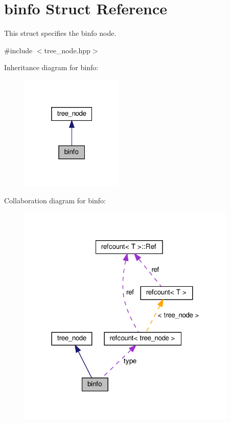 \hypertarget{structbinfo}{}\section{binfo Struct Reference}
\label{structbinfo}


This struct specifies the binfo node.  




{\ttfamily \#include $<$tree\+\_\+node.\+hpp$>$}



Inheritance diagram for binfo\+:
\nopagebreak
\begin{figure}[H]
\begin{center}
\leavevmode
\includegraphics[width=139pt]{da/d4d/structbinfo__inherit__graph}
\end{center}
\end{figure}


Collaboration diagram for binfo\+:
\nopagebreak
\begin{figure}[H]
\begin{center}
\leavevmode
\includegraphics[width=297pt]{df/d4c/structbinfo__coll__graph}
\end{center}
\end{figure}
